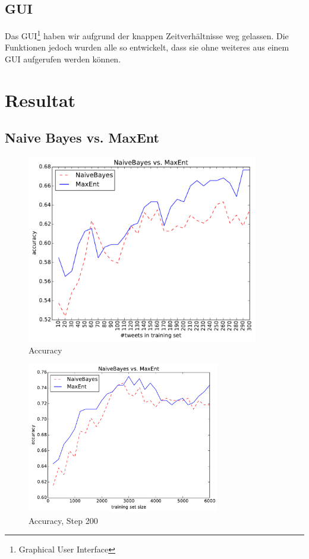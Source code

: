 \documentclass[12pt, oneside]{report}   	%
\begin{document}
\section{GUI}
Das GUI\footnote{Graphical User Interface} haben wir aufgrund der knappen Zeitverhältnisse weg gelassen. Die Funktionen jedoch wurden alle so entwickelt, dass sie ohne weiteres aus einem GUI aufgerufen werden können.


\chapter{Resultat}

\section{Naive Bayes vs. MaxEnt}

\begin{figure}[htbp]
\begin{center}
\includegraphics[width=0.9\textwidth]{bilder/cmp_nb_vs_me_S10_M300-16M.pdf}
\caption{Accuracy}
\label{img:acc}
\end{center}
\end{figure}

\begin{figure}[htbp]
\begin{center}
\includegraphics[width=0.75\textwidth]{bilder/cmp_nb_vs_me_S200_M6000.pdf}
\caption{Accuracy, Step 200}
\label{img:acc2}
\end{center}
\end{figure}
\end{document}
